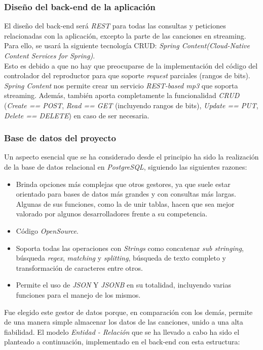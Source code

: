 \documentclass{article}
\begin{document}
\subsubsection{Diseño del back-end de la aplicación}
El diseño del back-end será \textit{REST} para todas las consultas y peticiones relacionadas con la aplicación, excepto la parte de las canciones en streaming. Para ello, se usará la siguiente tecnología CRUD: \textit{Spring Content(Cloud-Native Content Services for Spring)}. \\
\hfill \break
Esto es debido a que no hay que preocuparse de la implementación del código del controlador del reproductor para que soporte \textit{request} parciales (rangos de bits).\hfill \break
\textit{Spring Content} nos permite crear un servicio \textit{REST-based mp3}  que soporta streaming. Además, también aporta completamente la funcionalidad \textit{CRUD} (\textit{Create == POST}, \textit{Read == GET} (incluyendo rangos de bits), \textit{Update == PUT}, \textit{Delete == DELETE}) en caso de ser necesaria.
\subsubsection{Base de datos del proyecto}
Un aspecto esencial que se ha considerado desde el principio ha sido la realización de la base de datos relacional en \textit{PostgreSQL}, siguiendo las siguientes razones:
\begin{itemize}
	\item Brinda opciones más complejas que otros gestores, ya que suele estar orientado para bases de datos más grandes y con consultas más largas. Algunas de sus funciones, como la de unir tablas, hacen que sea mejor valorado por algunos desarrolladores frente a su competencia.
	\item Código \textit{OpenSource}.
	\item Soporta todas las operaciones con \textit{Strings} como concatenar \textit{sub stringing}, búsqueda \textit{regex}, \textit{matching} y \textit{splitting}, búsqueda de texto completo y transformación de caracteres entre otros.
	\item Permite el uso de \textit{JSON} Y \textit{JSONB} en su totalidad, incluyendo varias funciones para el manejo de los mismos.
\end{itemize}
Fue elegido este gestor de datos porque, en comparación con los demás, permite de una manera simple almacenar los datos de las canciones, unido a una alta fiabilidad.
\newpage
El modelo \textit{Entidad - Relación} que se ha llevado a cabo ha sido el planteado a continuación, implementado en el back-end con esta estructura:
\begin{figure}[H]
	\hspace*{-3.9cm}
\end{figure}
\newpage
\end{document}
